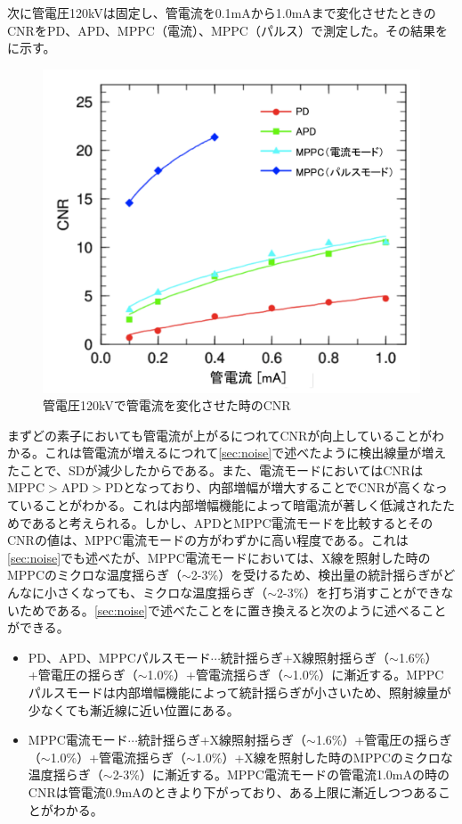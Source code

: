 次に管電圧120kVは固定し、管電流を0.1mAから1.0mAまで変化させたときのCNRをPD、APD、MPPC（電流）、MPPC（パルス）で測定した。その結果をに示す。



\begin{figure}[H]
 \begin{center}
 \includegraphics[bb=0.000000 0.000000 630.667865 539.955364,width=0.7\hsize]{image2/chapter5/cnr_current.png} 
 \end{center}
 \caption{管電圧120kVで管電流を変化させた時のCNR}
 \label{fig:cnr_current}
\end{figure}


まずどの素子においても管電流が上がるにつれてCNRが向上していることがわかる。これは管電流が増えるにつれて\ref{sec:noise}で述べたように検出線量が増えたことで、SDが減少したからである。また、電流モードにおいてはCNRはMPPC$>$APD$>$PDとなっており、内部増幅が増大することでCNRが高くなっていることがわかる。これは内部増幅機能によって暗電流が著しく低減されたためであると考えられる。しかし、APDとMPPC電流モードを比較するとそのCNRの値は、MPPC電流モードの方がわずかに高い程度である。これは\ref{sec:noise}でも述べたが、MPPC電流モードにおいては、X線を照射した時のMPPCのミクロな温度揺らぎ（$\sim$2-3\%）を受けるため、検出量の統計揺らぎがどんなに小さくなっても、ミクロな温度揺らぎ（$\sim$2-3\%）を打ち消すことができないためである。\ref{sec:noise}で述べたことをに置き換えると次のように述べることができる。

\begin{itemize}

\item PD、APD、MPPCパルスモード$\cdots$統計揺らぎ+X線照射揺らぎ（$\sim$1.6\%）+管電圧の揺らぎ（$\sim$1.0\%）+管電流揺らぎ（$\sim$1.0\%）に漸近する。MPPCパルスモードは内部増幅機能によって統計揺らぎが小さいため、照射線量が少なくても漸近線に近い位置にある。\\

\item MPPC電流モード$\cdots$統計揺らぎ+X線照射揺らぎ（$\sim$1.6\%）+管電圧の揺らぎ（$\sim$1.0\%）+管電流揺らぎ（$\sim$1.0\%）+X線を照射した時のMPPCのミクロな温度揺らぎ（$\sim$2-3\%）に漸近する。MPPC電流モードの管電流1.0mAの時のCNRは管電流0.9mAのときより下がっており、ある上限に漸近しつつあることがわかる。
\end{itemize}



